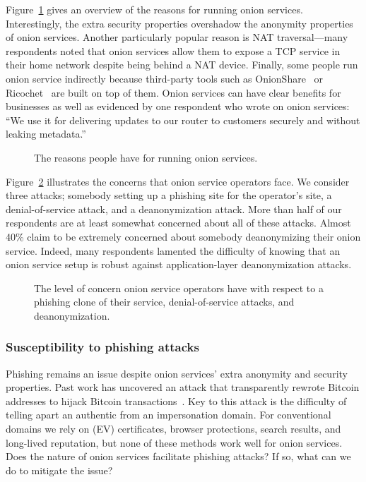 Figure~\ref{fig:onion-operation-reasons} gives an overview of the reasons for
running onion services.  Interestingly, the extra security properties overshadow
the anonymity properties of onion services.  Another particularly popular reason
is NAT traversal---many respondents noted that onion services allow them to
expose a TCP service in their home network despite being behind a NAT device.
Finally, some people run onion service indirectly because third-party tools such
as OnionShare~\cite{onionshare} or Ricochet~\cite{ricochet} are built on top of
them.  Onion services can have clear benefits for businesses as well as
evidenced by one respondent who wrote on onion services: ``We use it for
delivering updates to our router to customers securely and without leaking
metadata.''

\begin{figure}[t]
    \centering
    
    \caption{The reasons people have for running onion services.}
    \label{fig:onion-operation-reasons}
\end{figure}

Figure~\ref{fig:onion-operation-concerns} illustrates the concerns that onion
service operators face.  We consider three attacks; \first somebody setting up a
phishing site for the operator's site, \second a denial-of-service attack, and
\third a deanonymization attack.  More than half of our respondents are at least
somewhat concerned about all of these attacks.  Almost 40\% claim to be
extremely concerned about somebody deanonymizing their onion service.  Indeed,
many respondents lamented the difficulty of knowing that an onion service setup
is robust against application-layer deanonymization attacks.

\begin{figure}[t]
    \centering
    
    \caption{The level of concern onion service operators have with respect to a
    phishing clone of their service, denial-of-service attacks, and
    deanonymization.}
    \label{fig:onion-operation-concerns}
\end{figure}

\subsubsection{Susceptibility to phishing attacks}

Phishing remains an issue despite onion services' extra anonymity and security
properties.  Past work has uncovered an attack that transparently rewrote
Bitcoin addresses to hijack Bitcoin
transactions~\cite{Winter2016a,Nurmi2015a,Monteiro2016a}.  Key to this attack is
the difficulty of telling apart an authentic from an impersonation domain.  For
conventional domains we rely on (EV) certificates, browser protections, search
results, and long-lived reputation, but none of these methods work well for
onion services.  Does the nature of onion services facilitate phishing attacks?
If so, what can we do to mitigate the issue?

